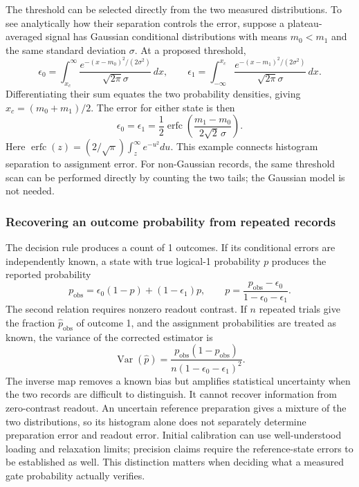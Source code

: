 The threshold can be selected directly from the two measured
distributions. To see analytically how their separation controls
the error, suppose a plateau-averaged signal has Gaussian
conditional distributions with means $m_0<m_1$ and the same
standard deviation $\sigma$. At a proposed threshold,
\[
 \epsilon_0=\int_{x_c}^{\infty}
  \frac{e^{-(x-m_0)^2/(2\sigma^2)}}{\sqrt{2\pi}\sigma}\,dx,
 \qquad
 \epsilon_1=\int_{-\infty}^{x_c}
  \frac{e^{-(x-m_1)^2/(2\sigma^2)}}{\sqrt{2\pi}\sigma}\,dx.
\]
Differentiating their sum equates the two probability densities,
giving $x_c=(m_0+m_1)/2$. The error for either state is then
\[
 \epsilon_0=\epsilon_1
 =\frac12\operatorname{erfc}
       \left(\frac{m_1-m_0}{2\sqrt2\,\sigma}\right).
\]
Here $\operatorname{erfc}(z)=(2/\sqrt\pi)\int_z^\infty e^{-u^2}du$.
This example connects histogram separation to assignment error.
For non-Gaussian records, the same threshold scan can be performed
directly by counting the two tails; the Gaussian model is not needed.

\subsubsection{Recovering an outcome probability from repeated records}
The decision rule produces a count of 1 outcomes. If its conditional
errors are independently known, a state with
true logical-1 probability $p$ produces the reported probability
\begin{equation}
 p_{\mathrm{obs}}
 =\epsilon_0(1-p)+(1-\epsilon_1)p,\qquad
 p=\frac{p_{\mathrm{obs}}-\epsilon_0}
         {1-\epsilon_0-\epsilon_1}.
 \label{eq:calibration-assignment-map}
\end{equation}
The second relation requires nonzero readout contrast.
If $n$ repeated trials give the fraction $\hat p_{\mathrm{obs}}$
of outcome 1, and the assignment probabilities are treated as known,
the variance of the corrected estimator is
\begin{equation}
 \operatorname{Var}(\hat p)
 =\frac{p_{\mathrm{obs}}(1-p_{\mathrm{obs}})}
        {n(1-\epsilon_0-\epsilon_1)^2}.
 \label{eq:calibration-assignment-variance}
\end{equation}
The inverse map removes a known bias but amplifies statistical
uncertainty when the two records are difficult to distinguish.
It cannot recover information from zero-contrast readout.
An uncertain reference preparation gives a mixture of the two
distributions, so its histogram alone does not separately determine
preparation error and readout error. Initial calibration can use
well-understood loading and relaxation limits; precision claims
require the reference-state errors to be established as well.
This distinction matters when deciding what a measured gate
probability actually verifies.

